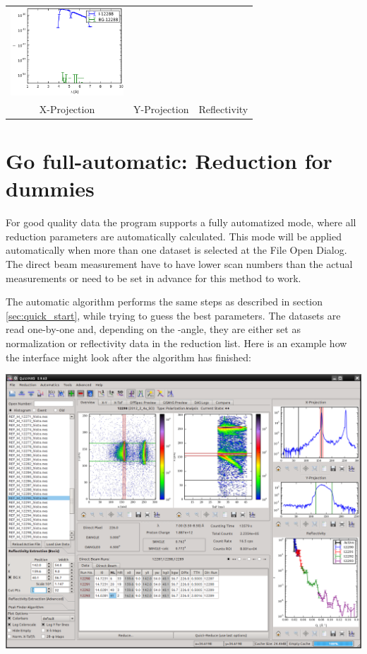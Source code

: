 \begin{tabular}{ccc}
  \includegraphics[width=120pt]{screenshots/normalize3.png} \\
  X-Projection & Y-Projection & Reflectivity
  \end{tabular}



\section{Go full-automatic: Reduction for dummies}
  For good quality data the program supports a fully automatized mode, where all reduction parameters are automatically calculated.
  This mode will be applied automatically when more than one dataset is selected at the File Open Dialog.
  The direct beam measurement have to have lower scan numbers than the actual measurements or need to be set in advance for this method to work.
  
  The automatic algorithm performs the same steps as described in section \ref{sec:quick_start}, while trying to guess the best parameters.
  The datasets are read one-by-one and, depending on the \tth-angle, they are either set as normalization or reflectivity data in the reduction list.
  Here is an example how the interface might look after the algorithm has finished:
  
  \includegraphics[width=460pt]{screenshots/overview.png}
  
